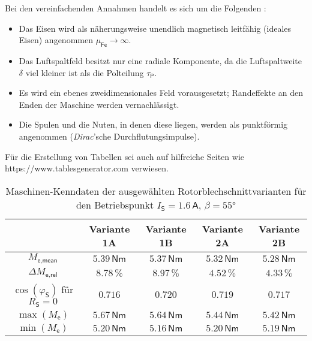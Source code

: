 Bei den vereinfachenden Annahmen handelt es sich um die Folgenden \cite{Binder.2017}:
\begin{itemize}
\item Das Eisen wird als näherungsweise unendlich magnetisch leitfähig (ideales Eisen) angenommen $\mu_{\textsf{Fe}} \to \infty$.
\item Das Luftspaltfeld besitzt nur eine radiale Komponente, da die Luftspaltweite $\delta$ viel kleiner ist als die Polteilung $\tau_{\textsf{P}}$. 
\item Es wird ein ebenes zweidimensionales Feld vorausgesetzt; Randeffekte an den Enden der Maschine werden vernachlässigt.
\item Die Spulen und die Nuten, in denen diese liegen, werden als punktförmig angenommen (\textit{Dirac}'sche Durchflutungsimpulse).
\end{itemize}

Für die Erstellung von Tabellen sei auch auf hilfreiche Seiten wie https://www.tablesgenerator.com verwiesen. 

\begin{table}[h]
	\begin{center}
		\caption[Maschinen-Kenndaten der ausgewählten Rotorblechschnittvarianten]{Maschinen-Kenndaten der ausgewählten Rotorblechschnittvarianten für den Betriebspunkt $I_\textsf{S}=1.6\,\textsf{A}$, $\beta =55°$}
		\begin{tabular}{c|c|c|c|c|}
		\cline{2-5}
		                       	    & Variante 1A & Variante 1B & Variante 2A & Variante 2B \\ \hline
		\multicolumn{1}{|c|}{$M_\textsf{e,mean}$} & $5.39\,\textsf{Nm}$ & $5.37\,\textsf{Nm}$ & $5.32\,\textsf{Nm}$ & $5.28\,\textsf{Nm}$ \\ \hline
		\multicolumn{1}{|c|}{$\Delta M_\textsf{e,rel}$} & $8.78\,\%$ & $8.97\,\%$ & $4.52\,\%$ & $4.33\,\%$ \\ \hline
		\multicolumn{1}{|c|}{$\cos\left(\varphi_\textsf{S} \right)$ für $R_\textsf{S}=0$} & $0.716$ & $0.720$ & $0.719$ & $0.717$ \\ \hline
		\multicolumn{1}{|c|}{$\max\left(M_\textsf{e} \right)$} & $5.67\,\textsf{Nm}$ & $5.64\,\textsf{Nm}$ & $5.44\,\textsf{Nm}$ & $5.42\,\textsf{Nm}$ \\ \hline
		\multicolumn{1}{|c|}{$\min\left(M_\textsf{e} \right)$} & $5.20\,\textsf{Nm}$ & $5.16\,\textsf{Nm}$ & $5.20\,\textsf{Nm}$ & $5.19\,\textsf{Nm}$ \\ \hline
		\end{tabular}
		\label{tab_03Grundlagen1_1_1}
	\end{center}
\end{table}

